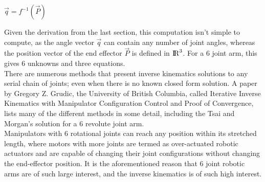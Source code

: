 \documentclass[12pt,openany,a4paper]{book}
\begin{document}
$\vec{q} = f^{-1}( \vec{P} )$

Given the derivation from the last section, this computation isn't simple to compute, as the angle vector $\vec{q}$ can contain any number of joint angles, whereas the position vector of the end effector $\vec{P}$ is defined in ${\rm I\!R}^3$. For a 6 joint arm, this gives 6 unknowns and three equations.\\

There are numerous methods that present inverse kinematics solutions to any serial chain of joints; even when there is no known closed form solution. A paper by Gregory Z. Grudic, the University of British Columbia, called Iterative Inverse Kinematics with Manipulator Configuration Control and Proof of Convergence, lists many of the different methods in some detail, including the Tsai and Morgan's solution for a 6 revolute joint arm. \\
Manipulators with 6 rotational joints can reach any position within its stretched length, where motors with more joints are termed as over-actuated robotic actuators and are capable of changing their joint configurations without changing the end-effector position. It is the aforementioned reason that 6 joint robotic arms are of such large interest, and the inverse kinematics is of such high interest.\\
\end{document}
